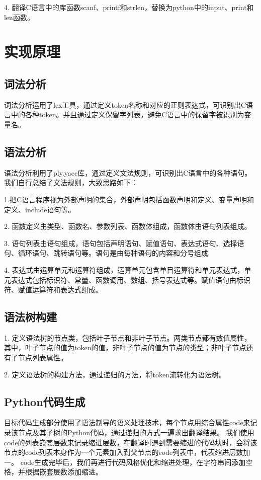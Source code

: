 \documentclass{article}
\begin{document}
4. 翻译C语言中的库函数scanf、printf和strlen，替换为python中的input、print和len函数。


\section{实现原理}
\subsection{词法分析}
词法分析运用了lex工具，通过定义token名称和对应的正则表达式，可识别出C语言中的各种token。并且通过定义保留字列表，避免C语言中的保留字被识别为变量名。

\subsection{语法分析}
语法分析利用了ply.yacc库，通过定义文法规则，可识别出C语言中的各种语句。
我们自行总结了文法规则，大致思路如下：

1.把C语言程序视为外部声明的集合，外部声明包括函数声明和定义、变量声明和定义、include语句等。

2. 函数定义由类型、函数名、参数列表、函数体组成，函数体由语句列表组成。

3. 语句列表由语句组成，语句包括声明语句、赋值语句、表达式语句、选择语句、循环语句、跳转语句等。语句是由每种语句的内容和分号组成

4. 表达式由运算单元和运算符组成，运算单元包含单目运算符和单元表达式，单元表达式包括标识符、常量、函数调用、数组、括号表达式等。赋值语句由标识符、赋值运算符和表达式组成。


\subsection{语法树构建}
1. 定义语法树的节点类，包括叶子节点和非叶子节点。两类节点都有数值属性，其中，叶子节点的值为token的值，非叶子节点的值为节点的类型；非叶子节点还有子节点列表属性。

2. 定义语法树的构建方法，通过递归的方法，将token流转化为语法树。

\subsection{Python代码生成}
目标代码生成部分使用了语法制导的语义处理技术，每个节点用综合属性code来记录该节点及其子树的Python代码，通过递归的方式一遍求出翻译结果。
我们使用code的列表嵌套层数来记录缩进层数，在翻译时遇到需要缩进的代码块时，会将该节点的code列表本身作为一个元素加入到父节点的code列表中，代表缩进层数加一。
code生成完毕后，我们再进行代码风格优化和缩进处理，在字符串间添加空格，并根据嵌套层数添加缩进。
\end{document}
